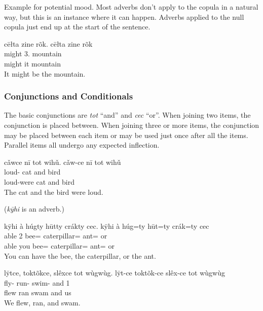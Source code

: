 \documentclass[12pt]{article}
\begin{document}
    Example for potential mood.
    Most adverbs don't apply to the copula in a natural way,
    but this is an instance where it can happen.
    Adverbs applied to the null copula just end up at the start of the sentence.
    \begin{exe}
        \ex
        \glt
        cēłta zine rõk.
        \glll
        cēłta zine rõk \\
        might 3\Sg{}.\Inanim{} mountain \\
        might it mountain \\
        \glt
        It might be the mountain.
    \end{exe}

    \subsubsection*{Conjunctions and Conditionals}

    The basic conjunctions are \textit{tot} ``and''
    and \textit{cec} ``or''.
    When joining two items, the conjunction is placed between.
    When joining three or more items,
    the conjunction may be placed between each item
    or may be used just once after all the items.
    Parallel items all undergo any expected inflection.

    \begin{exe}
        \ex
        \glt
        cǎwce nī tot wihǔ.
        \glll
        cǎw-ce nī tot wihǔ \\
        loud-\Pst{} cat and bird \\
        loud-were cat and bird \\
        \glt
        The cat and the bird were loud.
    \end{exe}

    (\textit{kȳhi} is an adverb.)
    \begin{exe}
        \ex
        \glt
        kȳhi à húgty hūtty crákty cec.
        \glll
        kȳhi à húg=ty hūt=ty crák=ty cec \\
        able 2\Sg{} bee=\Poss{} caterpillar=\Poss{} ant=\Poss{} or \\
        able you bee=\Poss{} caterpillar=\Poss{} ant=\Poss{} or \\
        \glt
        You can have the bee, the caterpillar, or the ant.
    \end{exe}

    \begin{exe}
        \ex
        \glt
        lȳtce, toktõkce, slêxce tot wùgwùg.
        \glll
        lȳt-ce toktõk-ce slêx-ce tot wùgwùg \\
        fly-\Pst{} run-\Pst{} swim-\Pst{} and 1\Pl{} \\
        flew ran swam and us \\
        \glt
        We flew, ran, and swam.
    \end{exe}
\end{document}
